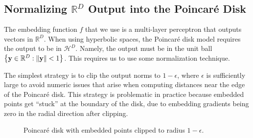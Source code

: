 \documentclass{article}
\begin{document}
\subsection{Normalizing $\mathbb{R}^D$ Output into the Poincaré Disk}

The embedding function $f$ that we use is a multi-layer perceptron that outputs vectors in $\mathbb R^D$. When using hyperbolic spaces, the Poincaré disk model requires the output to be in $\mathcal H^D$. Namely, the output must be in the unit ball $\qty{\mathbf y \in \mathbb R^D : \norm{\mathbf y} < 1}$. This requires us to use some normalization technique.

The simplest strategy is to clip the output norms to $1-\epsilon$, where $\epsilon$ is sufficiently large to avoid numeric issues that arise when computing distances near the edge of the Poincaré disk. This strategy is problematic in practice because embedded points get ``stuck'' at the boundary of the disk, due to embedding gradients being zero in the radial direction after clipping.

\begin{figure}[H]
  \centering
  \caption{Poincaré disk with embedded points clipped to radius $1 - \epsilon$.}
  \label{fig:poincare-disk-epsilon}
\end{figure}
\end{document}
